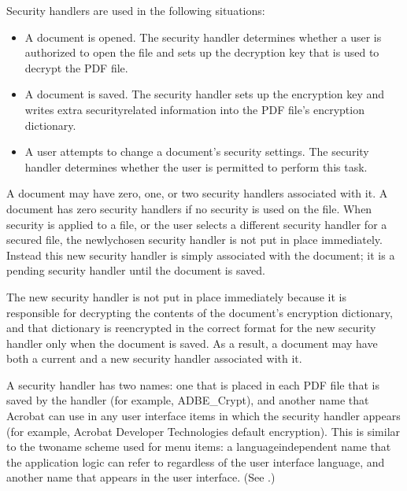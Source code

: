 \documentclass[letterpaper,12pt,english,openany,oneside]{sphinxmanual}
\begin{document}
Security handlers are used in the following situations:
\begin{itemize}
\item {} 
A document is opened. The security handler determines whether a user is authorized to open the file and sets up the decryption key that is used to decrypt the PDF file.

\item {} 
A document is saved. The security handler sets up the encryption key and writes extra security\sphinxhyphen{}related information into the PDF file’s encryption dictionary.

\item {} 
A user attempts to change a document’s security settings. The security handler determines whether the user is permitted to perform this task.

\end{itemize}

A document may have zero, one, or two security handlers associated with it. A document has zero security handlers if no security is used on the file. When security is applied to a file, or the user selects a different security handler for a secured file, the newly\sphinxhyphen{}chosen security handler is not put in place immediately. Instead this new security handler is simply associated with the document; it is a pending security handler until the document is saved.

The new security handler is not put in place immediately because it is responsible for decrypting the contents of the document’s encryption dictionary, and that dictionary is re\sphinxhyphen{}encrypted in the correct format for the new security handler only when the document is saved. As a result, a document may have both a current and a new security handler associated with it.

A security handler has two names: one that is placed in each PDF file that is saved by the handler (for example, ADBE\_Crypt), and another name that Acrobat can use in any user interface items in which the security handler appears (for example, Acrobat Developer Technologies default encryption). This is similar to the two\sphinxhyphen{}name scheme used for menu items: a language\sphinxhyphen{}independent name that the application logic can refer to regardless of the user interface language, and another name that appears in the user interface. (See .)
\end{document}
